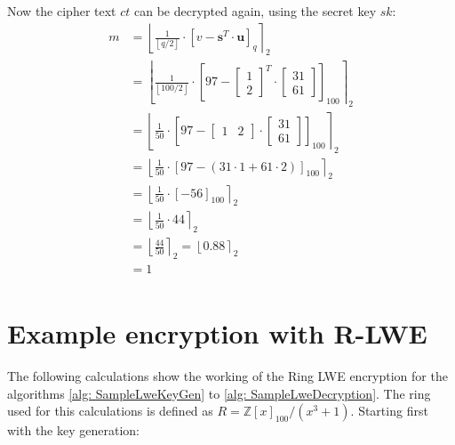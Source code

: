 Now the cipher text $ct$ can be decrypted again, using the secret key $sk$:
\begin{align*}
  m & = \left\lfloor \frac{1}{\left\lfloor q/2\right\rfloor} \cdot\left[v-\textbf{s}^T \cdot \textbf{u}\right]_{q} \right\rceil _2 \\
    & = \left\lfloor \frac{1}{\left\lfloor 100/2\right\rfloor} \cdot \left[97-
    \begin{bmatrix}
      1 \\
      2
    \end{bmatrix}^T
    \cdot
  \begin{bmatrix}
      31 \\
      61
    \end{bmatrix} \right]_{100}\right\rceil _2                                                                                       \\
    & = \left\lfloor \frac{1}{50} \cdot \left[97-
    \begin{bmatrix}
      1 & 2 
    \end{bmatrix}
    \cdot 
  \begin{bmatrix}
      31 \\ 
      61
    \end{bmatrix}\right]_{100}\right\rceil _2                                                                                        \\
    & = \left\lfloor \frac{1}{50} \cdot \left[97-(31 \cdot 1 + 61 \cdot 2)\right]_{100}\right\rceil _2                             \\
    & = \left\lfloor \frac{1}{50} \cdot \left[-56\right] _{100}\right\rceil _2                                                     \\
    & = \left\lfloor \frac{1}{50} \cdot 44\right\rceil _2                                                                          \\
    & = \left\lfloor \frac{44}{50}\right\rceil _2  = \left\lfloor 0.88\right\rceil _2                                              \\
    & = 1                                                                                                                          \\
\end{align*}

\section{Example encryption with R-LWE}
\label{app:RlweExampleCalc}
The following calculations show the working of the Ring LWE encryption for the algorithms \ref{alg: SampleLweKeyGen} to \ref{alg: SampleLweDecryption}. The ring used for this calculations is defined as $R=\mathbb{Z}[x]_{100}/(x^3+1)$. Starting first with the key generation:

